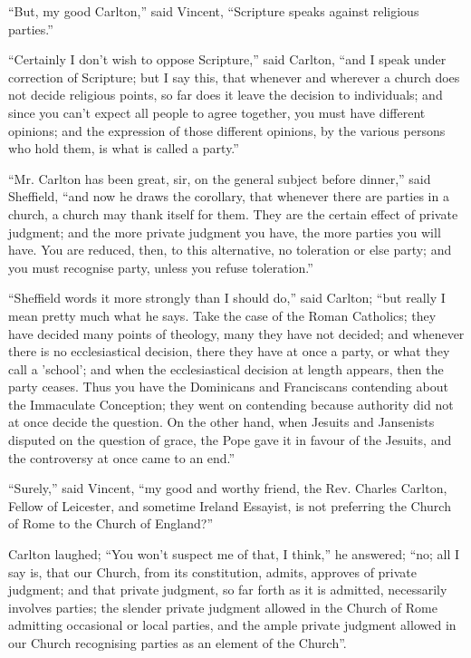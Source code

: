 ``But, my good Carlton,'' said Vincent, ``Scripture
speaks against religious parties.''

``Certainly I don't wish to oppose Scripture,'' said
Carlton, ``and I speak under correction of Scripture; but I say
this, that whenever and wherever a church does not decide religious
points, so far does it leave the decision to individuals; and since
you can't expect all people to agree together, you must have different
opinions; and the expression of those different opinions, by the
various persons who hold them, is what is called a party.''

``Mr. Carlton has been great, sir, on the general subject
before dinner,'' said Sheffield, ``and now he draws the
corollary, that whenever there are parties in a church, a church may
thank itself for them. They are the certain effect of private
judgment; and the more private judgment you have, the more parties you
will have. You are reduced, then, to this alternative, no toleration
or else party; and you must recognise party, unless you refuse
toleration.''

``Sheffield words it more strongly than I should do,'' said
Carlton; ``but really I mean pretty much what he says. Take the
case of the Roman Catholics; they have decided many points of
theology, many they have not decided; and whenever there is no
ecclesiastical decision, there they have at once a party, or what they
call a 'school'; and when the ecclesiastical decision at length
appears, then the party ceases. Thus you have the Dominicans and
Franciscans contending about the Immaculate Conception; they went on
contending because authority did not at once decide the question. On
the other hand, when Jesuits and Jansenists disputed on the question
of grace, the Pope gave it in favour of the Jesuits, and the
controversy at once came to an end.''

``Surely,'' said Vincent, ``my good and worthy friend,
the Rev. Charles Carlton, Fellow of Leicester, and sometime Ireland
Essayist, is not preferring the Church of Rome to the Church of
England?''

Carlton laughed; ``You won't suspect me of that, I think,''
he answered; ``no; all I say is, that our Church, from its
constitution, admits, approves of private judgment; and that private
judgment, so far forth as it is admitted, necessarily involves
parties; the slender private judgment allowed in the Church of Rome
admitting occasional or local parties, and the ample private judgment
allowed in our Church recognising parties as an element of the
Church''.

